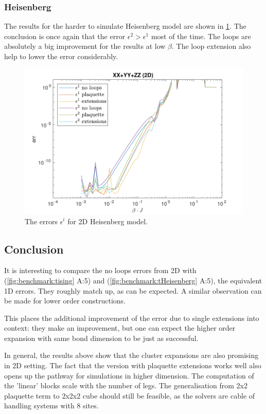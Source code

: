 \subsubsection{Heisenberg}

The results for the harder to simulate Heisenberg model are shown in \cref{fig:res2d:n1:heis}. The conclusion is once again that the error $\epsilon^2 > \epsilon^1$ most of the time. The loops are absolutely a big improvement for  the results at low $\beta$. The loop extension also help to lower the error considerably.

\begin{figure}
    \center
    \includegraphics[width=\textwidth]{Figuren/benchmarking/2D_Err01_heis.pdf}
    \caption{The errors $\epsilon^i$ for 2D Heisenberg model. }
    \label{fig:res2d:n1:heis}
\end{figure}

\subsection{Conclusion}

It is interesting to compare the no loops errors from 2D with (\cref{fig:benchmark:tising} A:5) and (\cref{fig:benchmark:tHeisenberg} A:5), the equivalent 1D errors.  They roughly match up, as can be expected. A similar observation can be made for lower order constructions.

This places the additional improvement of the error due to single extensions into context: they make an improvement, but one can expect the higher order expansion with same bond dimension to be just as successful.

In general, the results above show that the cluster expansions are also promising in 2D setting. The fact that the version with plaquette extensions works well also opens up the pathway for simulations in higher dimension. The computation of the 'linear' blocks scale with the number of legs. The generalisation from 2x2 plaquette term to 2x2x2 cube should still be feasible, as the solvers are cable of handling systems with 8 sites.